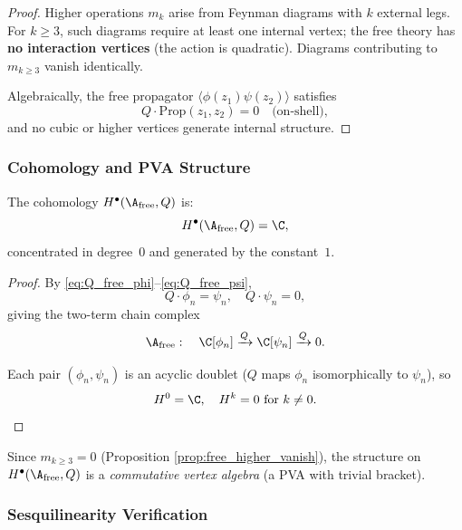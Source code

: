 \begin{proof}
Higher operations $m_k$ arise from Feynman diagrams with $k$ external legs. For $k \geq 3$, such diagrams require at least one internal vertex; the free theory has \textbf{no interaction vertices} (the action is quadratic). Diagrams contributing to $m_{k \geq 3}$ vanish identically.

Algebraically, the free propagator $\langle \phi(z_1)\psi(z_2)\rangle$ satisfies
\begin{equation}
Q \cdot \text{Prop}(z_1, z_2) = 0 \quad \text{(on-shell)},
\end{equation}
and no cubic or higher vertices generate internal structure.
\end{proof}

\subsubsection{Cohomology and PVA Structure}

\begin{proposition}
\label{prop:free_cohomology_complete}
The cohomology $H^\bullet(\A_{\text{free}}, Q)$ is:
\begin{equation}
H^\bullet(\A_{\text{free}}, Q) = \C,
\end{equation}
concentrated in degree~$0$ and generated by the constant~$1$.
\end{proposition}

\begin{proof}
By \eqref{eq:Q_free_phi}--\eqref{eq:Q_free_psi},
\begin{equation}
Q \cdot \phi_n = \psi_n, \quad Q \cdot \psi_n = 0,
\end{equation}
giving the two-term chain complex
\begin{equation}
\A_{\text{free}} : \quad \C[\phi_n] \xrightarrow{Q} \C[\psi_n] \xrightarrow{Q} 0.
\end{equation}

Each pair $(\phi_n, \psi_n)$ is an acyclic doublet ($Q$ maps $\phi_n$ isomorphically to $\psi_n$), so
\begin{equation}
H^0 = \C, \quad H^{k} = 0 \text{ for } k \neq 0.
\end{equation}
\end{proof}
Since $m_{k \geq 3} = 0$ (Proposition \ref{prop:free_higher_vanish}), the structure on $H^\bullet(\A_{\text{free}}, Q)$ is a \emph{commutative vertex algebra} (a PVA with trivial bracket).

\subsubsection{Sesquilinearity Verification}

